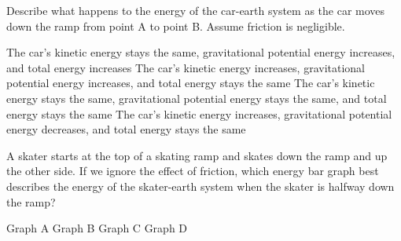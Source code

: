 \documentclass[answers,dvipsnames]{exam}
\begin{document}
\begin{questions}

\question
Describe what happens to the energy of the car-earth system as the car moves down the ramp from point A to point B. Assume friction is negligible. 

\begin{center}
\end{center}

\begin{randomizechoices}[norandomize]
    \choice The car's kinetic energy stays the same, gravitational potential energy increases, and total energy increases
    \choice The car's kinetic energy increases, gravitational potential energy increases, and total energy stays the same
    \choice The car's kinetic energy stays the same, gravitational potential energy stays the same, and total energy stays the same
    \correctchoice The car's kinetic energy increases, gravitational potential energy decreases, and total energy stays the same
\end{randomizechoices}

\question
A skater starts at the top of a skating ramp and skates down the ramp and up the other side. If we ignore the effect of friction, which energy bar graph best describes the energy of the skater-earth system when the skater is halfway down the ramp?

\begin{minipage}{0.6\textwidth}
    \centering
\end{minipage}%
\begin{minipage}{0.35\textwidth}
    \centering
    \begin{randomizechoices}[norandomize]
        \choice Graph A
        \correctchoice Graph B
        \choice Graph C
        \choice Graph D
    \end{randomizechoices}    
\end{minipage}%


\end{questions}
\end{document}
